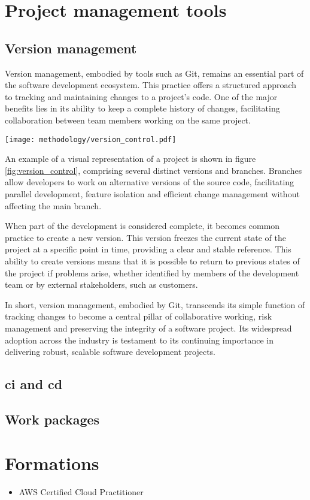 \section{Project management tools}

\subsection{Version management}
Version management, embodied by tools such as Git, remains an essential part of the software development ecosystem. This practice offers a structured approach to tracking and maintaining changes to a project's code. One of the major benefits lies in its ability to keep a complete history of changes, facilitating collaboration between team members working on the same project.
\begin{center}
    \begingroup
    \texttt{[image: methodology/version\_control.pdf]}
    \label{fig:version_control}
    \endgroup
\end{center}
An example of a visual representation of a project is shown in figure \ref{fig:version_control}, comprising several distinct versions and branches. Branches allow developers to work on alternative versions of the source code, facilitating parallel development, feature isolation and efficient change management without affecting the main branch.

When part of the development is considered complete, it becomes common practice to create a new version. This version freezes the current state of the project at a specific point in time, providing a clear and stable reference. This ability to create versions means that it is possible to return to previous states of the project if problems arise, whether identified by members of the development team or by external stakeholders, such as customers.

In short, version management, embodied by Git, transcends its simple function of tracking changes to become a central pillar of collaborative working, risk management and preserving the integrity of a software project. Its widespread adoption across the industry is testament to its continuing importance in delivering robust, scalable software development projects.

\subsection{\acrfull{ci} and \acrfull{cd}}

\subsection{Work packages}


\section{Formations}

\begin{itemize}
    \item AWS Certified Cloud Practitioner
\end{itemize}